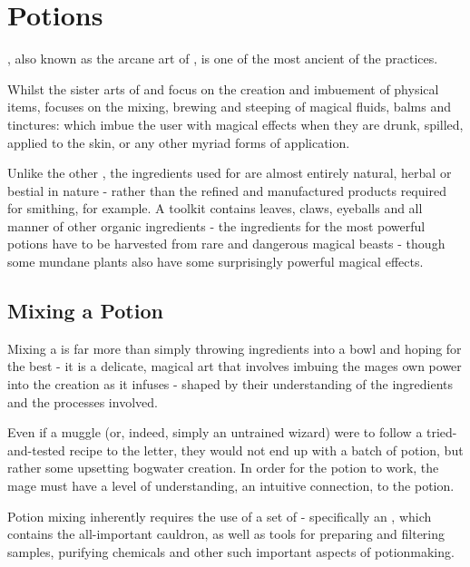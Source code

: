 \chapter{Potions}

, also known as the arcane art of , is one of the most ancient of the  practices.

Whilst the sister arts of  and  focus on the creation and imbuement of physical items,  focuses on the mixing, brewing and steeping of magical fluids, balms and tinctures:  which imbue the user with magical effects when they are drunk, spilled, applied to the skin, or any other myriad forms of application. 

Unlike the other , the ingredients used for  are almost entirely natural, herbal or bestial in nature - rather than the refined and manufactured products required for smithing, for example. A  toolkit contains leaves, claws, eyeballs and all manner of other organic ingredients - the ingredients for the most powerful potions have to be harvested from rare and dangerous magical beasts - though some mundane plants also have some surprisingly powerful magical effects. 

\section{Mixing a Potion}

Mixing a  is far more than simply throwing ingredients into a bowl and hoping for the best - it is a delicate, magical art that involves imbuing the mages own power into the creation as it infuses - shaped by their understanding of the ingredients and the processes involved. 

Even if a muggle (or, indeed, simply an untrained wizard) were to follow a tried-and-tested recipe to the letter, they would not end up with a batch of  potion, but rather some upsetting bogwater creation. In order for the potion to work, the mage must have a level of understanding, an intuitive connection, to the potion. 

Potion mixing inherently requires the use of a set of  - specifically an , which contains the all-important cauldron, as well as tools for preparing and filtering samples, purifying chemicals 
and other such important aspects of potionmaking.

